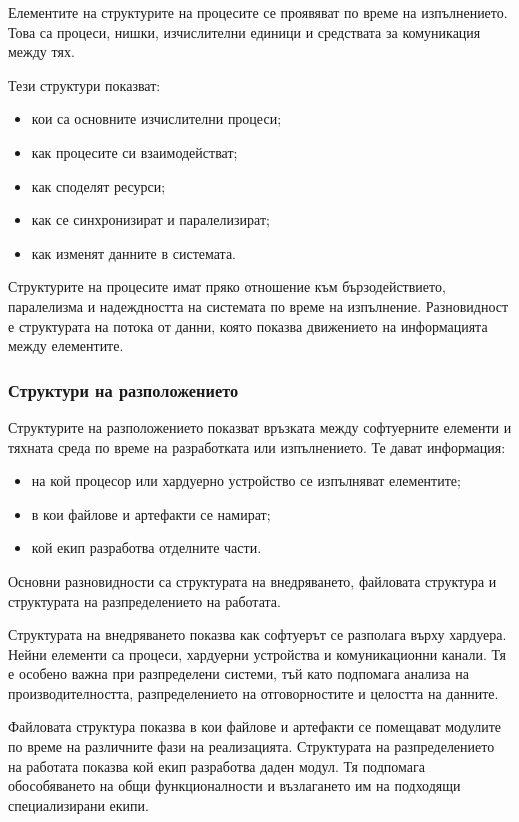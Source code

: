 Елементите на структурите на процесите се проявяват по време на изпълнението. Това са процеси, нишки, изчислителни единици и средствата за комуникация между тях.

Тези структури показват:

\begin{itemize}
    \item кои са основните изчислителни процеси;
    \item как процесите си взаимодействат;
    \item как споделят ресурси;
    \item как се синхронизират и паралелизират;
    \item как изменят данните в системата.
\end{itemize}

Структурите на процесите имат пряко отношение към бързодействието, паралелизма и надеждността на системата по време на изпълнение. Разновидност е структурата на потока от данни, която показва движението на информацията между елементите.

\subsubsection{Структури на разположението}

Структурите на разположението показват връзката между софтуерните елементи и тяхната среда по време на разработката или изпълнението. Те дават информация:

\begin{itemize}
    \item на кой процесор или хардуерно устройство се изпълняват елементите;
    \item в кои файлове и артефакти се намират;
    \item кой екип разработва отделните части.
\end{itemize}

Основни разновидности са структурата на внедряването, файловата структура и структурата на разпределението на работата.

Структурата на внедряването показва как софтуерът се разполага върху хардуера. Нейни елементи са процеси, хардуерни устройства и комуникационни канали. Тя е особено важна при разпределени системи, тъй като подпомага анализа на производителността, разпределението на отговорностите и целостта на данните.

Файловата структура показва в кои файлове и артефакти се помещават модулите по време на различните фази на реализацията. Структурата на разпределението на работата показва кой екип разработва даден модул. Тя подпомага обособяването на общи функционалности и възлагането им на подходящи специализирани екипи.

